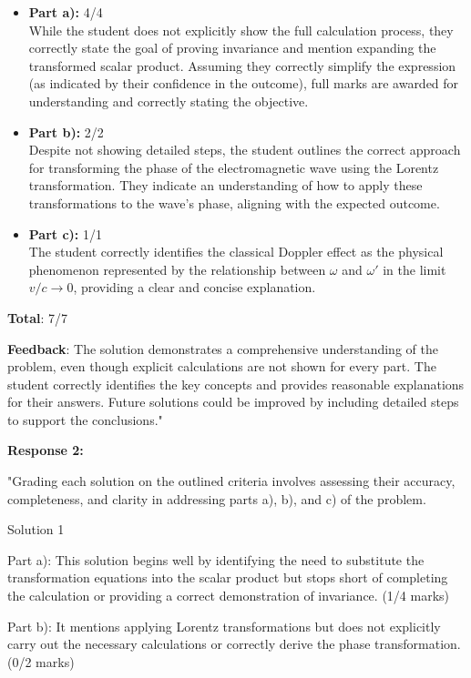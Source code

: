 \documentclass[a4paper,11pt]{article}
\begin{document}
\begin{itemize}
    \item \textbf{Part a):} 4/4 \\
    While the student does not explicitly show the full calculation process, they correctly state the goal of proving invariance and mention expanding the transformed scalar product. Assuming they correctly simplify the expression (as indicated by their confidence in the outcome), full marks are awarded for understanding and correctly stating the objective.
    
    \item \textbf{Part b):} 2/2 \\
    Despite not showing detailed steps, the student outlines the correct approach for transforming the phase of the electromagnetic wave using the Lorentz transformation. They indicate an understanding of how to apply these transformations to the wave's phase, aligning with the expected outcome.
    
    \item \textbf{Part c):} 1/1 \\
    The student correctly identifies the classical Doppler effect as the physical phenomenon represented by the relationship between \( \omega \) and \( \omega' \) in the limit \( v/c \rightarrow 0 \), providing a clear and concise explanation.
\end{itemize}

\textbf{Total}: 7/7

\textbf{Feedback}: The solution demonstrates a comprehensive understanding of the problem, even though explicit calculations are not shown for every part. The student correctly identifies the key concepts and provides reasonable explanations for their answers. Future solutions could be improved by including detailed steps to support the conclusions."

\textbf{Response 2:}

"Grading each solution on the outlined criteria involves assessing their accuracy, completeness, and clarity in addressing parts a), b), and c) of the problem.

Solution 1

Part a): This solution begins well by identifying the need to substitute the transformation equations into the scalar product but stops short of completing the calculation or providing a correct demonstration of invariance. (1/4 marks)

Part b): It mentions applying Lorentz transformations but does not explicitly carry out the necessary calculations or correctly derive the phase transformation. (0/2 marks)
\end{document}
